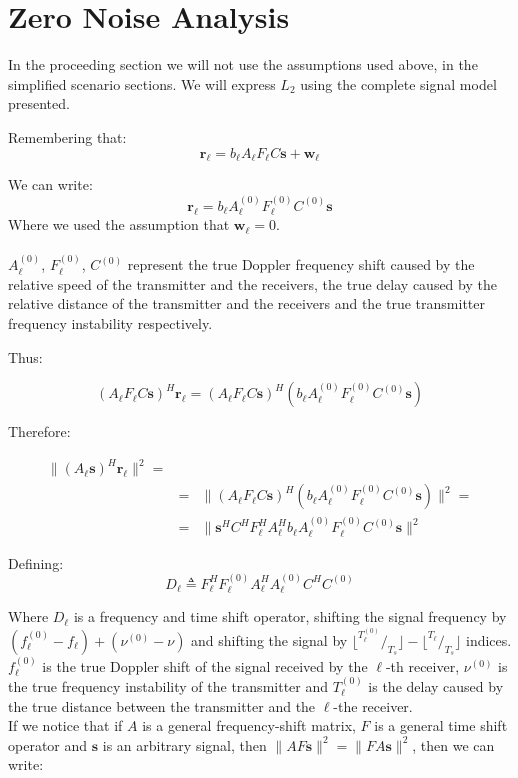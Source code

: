 \documentclass[10pt,a4paper]{report}
\begin{document}
\section{Zero Noise Analysis}

In the proceeding section we will not use the assumptions used above, in the simplified scenario sections.
We will express $L_2$ using the complete signal model presented.

Remembering that:
 $$\mathbf{r_\ell}=b_\ell A_\ell F_\ell C \mathbf{s} + \mathbf{w_\ell}$$ 
 
 We can write:
\begin{equation}
\mathbf{r_\ell}= b_\ell A_\ell^{(0)} F_\ell^{(0)} C^{(0)} \mathbf{s}
\end{equation}
Where we used the assumption that $\mathbf{w}_\ell=0$. 
\\ \\
$A^{(0)}_\ell$, $F_\ell^{(0)}$, $C^{(0)}$ represent the true Doppler frequency shift caused by the relative speed of the transmitter and the receivers, the true delay caused by the relative distance of the transmitter and the receivers and the true transmitter frequency instability respectively.

Thus:

\begin{equation}
\label{eq:analysis1}
(A_\ell F_\ell C \mathbf{s})^H\mathbf{r_\ell}=(A_\ell F_\ell C\mathbf{s})^H(b_\ell A_\ell^{(0)} F_\ell^{(0)} C^{(0)} \mathbf{s})
\end{equation}

Therefore:

\begin{eqnarray}
\|(A_\ell\mathbf{s})^H\mathbf{r_\ell}\|^2 =\\
&=&\|(A_\ell F_\ell C\mathbf{s})^H(b_\ell A_\ell^{(0)} F_\ell^{(0)} C^{(0)} \mathbf{s})\|^2= \nonumber \\
&=&\|\mathbf{s}^H C^H F_\ell^H A_\ell^H b_\ell A_\ell^{(0)} F_\ell^{(0)} C^{(0)} \mathbf{s}\|^2 \nonumber
\end{eqnarray}

Defining:
\begin{equation}
D_\ell \triangleq  F_\ell^H  F_\ell^{(0)} A_\ell^H A^{(0)}_\ell C^H C^{(0)}
\end{equation}

Where $D_\ell$ is a frequency and time shift operator, shifting the signal frequency by $(f^{(0)}_\ell-f_\ell)+(\nu^{(0)}-\nu)$ and shifting the signal by $\lfloor ^{T_\ell^{(0)}}/_{T_s} \rfloor- \lfloor ^{T_\ell}/_{T_s} \rfloor$ indices. $f^{(0)}_\ell$ is the true Doppler shift of the signal received by the $\ell$-th receiver, $\nu^{(0)}$ is the true frequency instability of the transmitter and $T_\ell^{(0)}$ is the delay caused by the true distance between the transmitter and the $\ell$-the receiver.
\\
If we notice that if $A$ is a general frequency-shift matrix, $F$ is a general time shift
operator and $\mathbf{s}$ is an arbitrary signal, then $\|AF\mathbf{s}\|^2=\|FA\mathbf{s}\|^2$,
then we can write:
\end{document}
